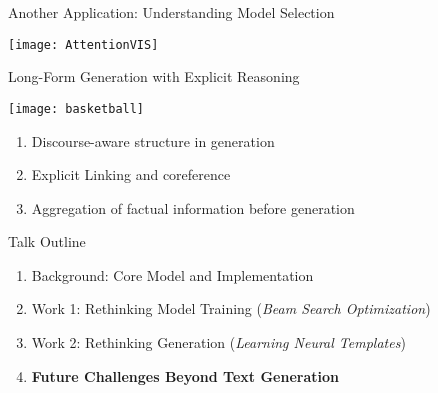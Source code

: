 \begin{frame}{Another Application: Understanding Model Selection}
  \begin{center}
    \texttt{[image: AttentionVIS]}
  \end{center}
\end{frame}


\begin{frame}{Long-Form Generation with Explicit Reasoning}
  \begin{center}
    \texttt{[image: basketball]}
  \end{center}
  \begin{enumerate}
  \item Discourse-aware structure in generation  
  \item Explicit Linking and coreference 
  \item Aggregation of factual information before generation
  \end{enumerate}
\end{frame}


\begin{frame}{Talk Outline}

  \begin{enumerate}
  \item Background: Core Model and Implementation
    \air
  \item Work 1: Rethinking Model Training (\textit{Beam Search Optimization})
    \air

  \item Work 2: Rethinking  Generation  (\textit{Learning Neural Templates})
    \air

  \item \textbf{Future Challenges Beyond Text Generation}
  \end{enumerate}
\end{frame}




